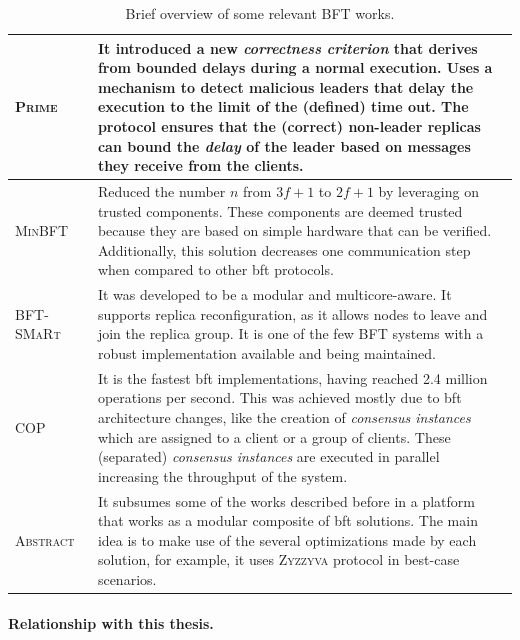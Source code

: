 \begin{table}[t]
\begin{center}
{\begin{tabular}{ p{2.4cm}  p{11.5cm}  }
\textsc{Prime}~\cite{Amir:2011} & It introduced a new \emph{correctness criterion} that derives from bounded delays during a normal execution. Uses a mechanism to detect malicious leaders that delay the execution to the limit of the (defined) time out. The protocol ensures that the (correct) non-leader replicas can bound the \emph{delay} of the leader based on messages they receive from the clients. \\ \hline

\textsc{MinBFT}~\cite{Veronese:2013}  & Reduced the number $n$ from $3f+1$ to $2f+1$ by leveraging on trusted components. These components are deemed trusted because they are based on simple hardware that can be verified. Additionally, this solution decreases one communication step when compared to other \gls{bft} protocols. \\ \hline

\textsc{BFT-SMaRt}~\cite{Bessani:2014} & It was developed to be a modular and multicore-aware. It supports replica reconfiguration, as it allows nodes to leave and join the replica group. It is one of the few BFT systems with a robust implementation available and being maintained.  \\ \hline

\textsc{COP}~\cite{Behl:2015} & It is the fastest \gls{bft} implementations, having reached 2.4 million operations per second. This was achieved mostly due to \gls{bft} architecture changes, like the creation of \emph{consensus instances} which are assigned to a client or a group of clients. These (separated) \emph{consensus instances} are executed in parallel increasing the throughput of the system.\\  \hline  

\textsc{Abstract}~\cite{Aublin:2015} & It subsumes some of the works described before in a platform that works as a modular composite of \gls{bft} solutions. The main idea is to make use of the several optimizations made by each solution, for example, it uses \textsc{Zyzzyva} protocol in best-case scenarios.\\ \hline


\end{tabular}
}
\vspace{2mm}
\caption{Brief overview of some relevant BFT works.}
\label{tab:bft}
\end{center}
\end{table}




\paragraph{Relationship with this thesis.} 

